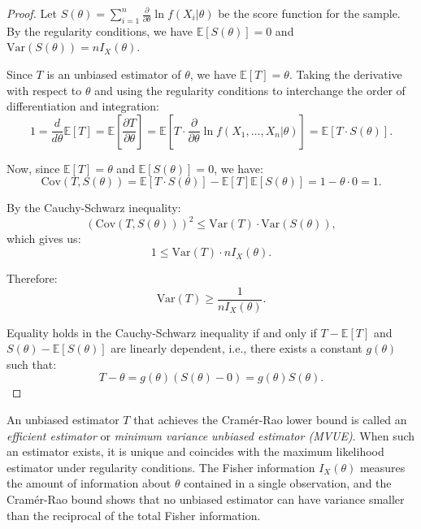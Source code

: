 \begin{proof}
    Let $S(\theta) = \sum_{i=1}^n \frac{\partial}{\partial \theta} \ln f(X_i|\theta)$ be the score function for the sample. By the regularity conditions, we have $\mathbb{E}[S(\theta)] = 0$ and $\text{Var}(S(\theta)) = nI_X(\theta)$.
    
    Since $T$ is an unbiased estimator of $\theta$, we have $\mathbb{E}[T] = \theta$. Taking the derivative with respect to $\theta$ and using the regularity conditions to interchange the order of differentiation and integration:
    \[
        1 = \frac{d}{d\theta}\mathbb{E}[T] = \mathbb{E}\left[\frac{\partial T}{\partial \theta}\right] = \mathbb{E}\left[T \cdot \frac{\partial}{\partial \theta} \ln f(X_1, \ldots, X_n|\theta)\right] = \mathbb{E}[T \cdot S(\theta)].
    \]
    
    Now, since $\mathbb{E}[T] = \theta$ and $\mathbb{E}[S(\theta)] = 0$, we have:
    \[
        \text{Cov}(T, S(\theta)) = \mathbb{E}[T \cdot S(\theta)] - \mathbb{E}[T] \mathbb{E}[S(\theta)] = 1 - \theta \cdot 0 = 1.
    \]
    
    By the Cauchy-Schwarz inequality:
    \[
        (\text{Cov}(T, S(\theta)))^2 \leq \text{Var}(T) \cdot \text{Var}(S(\theta)),
    \]
    which gives us:
    \[
        1 \leq \text{Var}(T) \cdot nI_X(\theta).
    \]
    
    Therefore:
    \[
        \text{Var}(T) \geq \frac{1}{nI_X(\theta)}.
    \]
    
    Equality holds in the Cauchy-Schwarz inequality if and only if $T - \mathbb{E}[T]$ and $S(\theta) - \mathbb{E}[S(\theta)]$ are linearly dependent, i.e., there exists a constant $g(\theta)$ such that:
    \[
        T - \theta = g(\theta)(S(\theta) - 0) = g(\theta)S(\theta).
    \]
\end{proof}

\begin{remark}
    An unbiased estimator $T$ that achieves the Cramér-Rao lower bound is called an \emph{efficient estimator} or \emph{minimum variance unbiased estimator (MVUE)}. When such an estimator exists, it is unique and coincides with the maximum likelihood estimator under regularity conditions. The Fisher information $I_X(\theta)$ measures the amount of information about $\theta$ contained in a single observation, and the Cramér-Rao bound shows that no unbiased estimator can have variance smaller than the reciprocal of the total Fisher information.
\end{remark}

